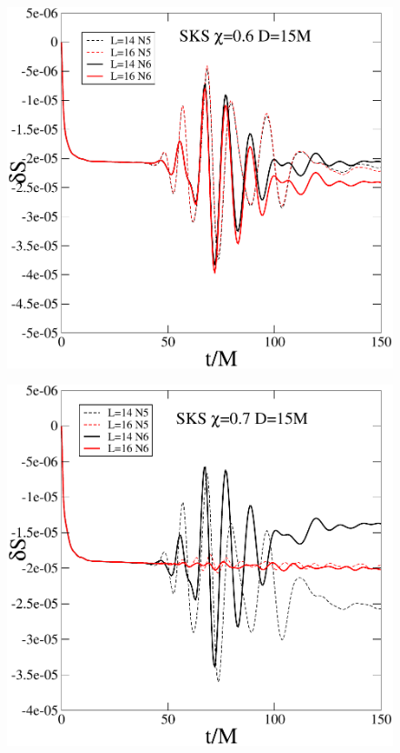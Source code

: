 \documentclass[aps,prd,amsmath,floatfix,twocolumn,superscriptaddress,nofootinbib,showpacs]{revtex4-1}
\theoremstyle{plain}
\theoremstyle{definition}
\begin{document}
\begin{figure}
  \includegraphics[width=0.99\columnwidth]{dS_SKS_S6}
\end{figure}

\begin{figure}
  \includegraphics[width=0.99\columnwidth]{dS_SKS_S7}
\end{figure}
\end{document}
